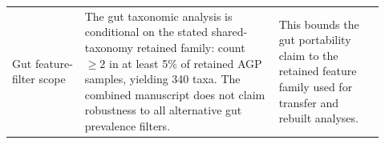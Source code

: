 \begin{longtable}{p{0.18\linewidth}p{0.48\linewidth}p{0.26\linewidth}}
\midrule
Gut feature-filter scope & The gut taxonomic analysis is conditional on the stated shared-taxonomy retained family: count \(\geq2\) in at least 5\% of retained AGP samples, yielding 340 taxa. The combined manuscript does not claim robustness to all alternative gut prevalence filters. & This bounds the gut portability claim to the retained feature family used for transfer and rebuilt analyses. \\
\end{longtable}
